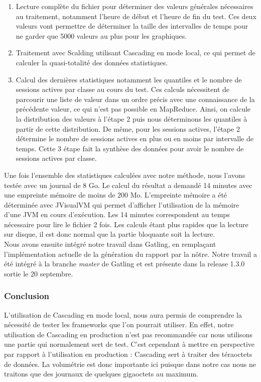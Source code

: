 \begin{enumerate}
 \item Lecture complète du fichier pour déterminer des valeurs générales nécessaires au traitement, notamment l'heure de début et l'heure de fin du test. Ces deux valeurs vont permettre de déterminer la taille des intervalles de temps pour ne garder que 5000 valeurs au plus pour les graphiques.
 \item Traitement avec Scalding utilisant Cascading en mode local, ce qui permet de calculer la quasi-totalité des données statistiques.
 \item Calcul des dernières statistiques notamment les quantiles et le nombre de sessions actives par classe au cours du test. Ces calculs nécessitent de parcourir une liste de valeur dans un ordre précis avec une connaissance de la précédente valeur, ce qui n'est pas possible en MapReduce. Ainsi, on calcule la distribution des valeurs à l'étape 2 puis nous déterminons les quantiles à partir de cette distribution. De même, pour les sessions actives, l'étape 2 détermine le nombre de sessions actives en plus ou en moins par intervalle de temps. Cette 3\ieme{} étape fait la synthèse des données pour avoir le nombre de sessions actives par classe.\\
\end{enumerate}

Une fois l'ensemble des statistiques calculées avec notre méthode, nous l'avons testée avec un journal de 8 Go. Le calcul du résultat a demandé 14 minutes avec une empreinte mémoire de moins de 200 Mo. L'empreinte mémoire a été déterminée avec JVisualVM qui permet d'afficher l'utilisation de la mémoire d'une JVM en cours d'exécution. Les 14 minutes correspondent au temps nécessaire pour lire le fichier 2 fois. Les calculs étant plus rapides que la lecture sur disque, il est donc normal que la partie bloquante soit la lecture.\\

Nous avons ensuite intégré notre travail dans Gatling, en remplaçant l'implémentation actuelle de la génération du rapport par la nôtre. Notre travail a été intégré à la branche \textit{master} de Gatling et est présente dans la release 1.3.0 sortie le 20 septembre.

\subsubsection{Conclusion}

L'utilisation de Cascading en mode local, nous aura permis de comprendre la nécessité de tester les frameworks que l'on pourrait utiliser. En effet, notre utilisation de Cascading en production n'est pas recommandée car nous utilisons une partie qui normalement sert de test. C'est cependant à mettre en perspective par rapport à l'utilisation en production : Cascading sert à traiter des téraoctets de données. La volumétrie est donc importante ici puisque dans notre cas nous ne traitons que des journaux de quelques gigaoctets au maximum.\\

